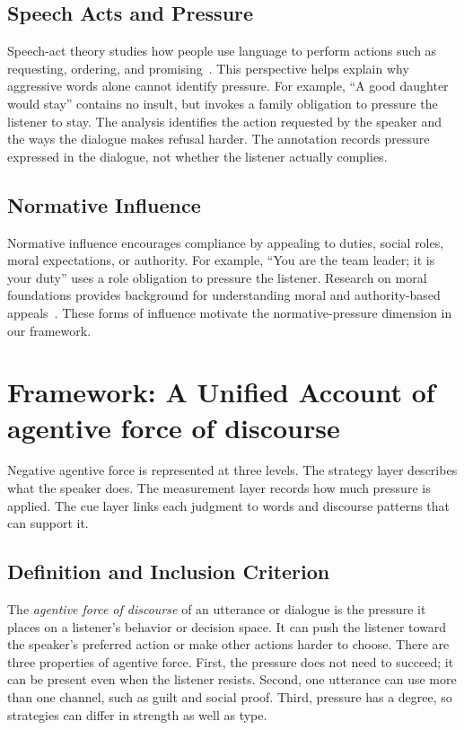 \documentclass[conference]{IEEEtran}
\newcommand{\afd}{agentive force of discourse}
\begin{document}
\subsection{Speech Acts and Pressure}
Speech-act theory studies how people use language to perform actions such as
requesting, ordering, and promising~\cite{austin1962,searle1969}.
This perspective helps explain why aggressive words alone cannot identify
pressure. For example, ``A good daughter would stay'' contains no insult,
but invokes a family obligation to pressure the listener to stay.
The analysis identifies the action requested by the speaker and the ways the
dialogue makes refusal harder. The annotation records pressure expressed in
the dialogue, not whether the listener actually complies.

\subsection{Normative Influence}
Normative influence encourages compliance by appealing to duties, social
roles, moral expectations, or authority. For example, ``You are the team
leader; it is your duty'' uses a role obligation to pressure the listener.
Research on moral foundations provides background for understanding moral
and authority-based appeals~\cite{graham2009}. These forms of influence
motivate the normative-pressure dimension in our framework.

\section{Framework: A Unified Account of \afd}
\label{sec:framework}
Negative agentive force is represented at three levels. The strategy layer
describes what the speaker does. The measurement layer records how much
pressure is applied. The cue layer links each judgment to words and discourse
patterns that can support it.
\subsection{Definition and Inclusion Criterion}
The \emph{\afd{}} of an utterance or dialogue is the pressure it places on a
listener's behavior or decision space. It can push the listener toward the
speaker's preferred action or make other actions harder to choose. There are
three properties of agentive force. First, the pressure does not need to
succeed; it can be present even when the listener resists. Second, one
utterance can use more than one channel, such as guilt and social proof.
Third, pressure has a degree, so strategies can differ in strength as well as
type.
\end{document}

